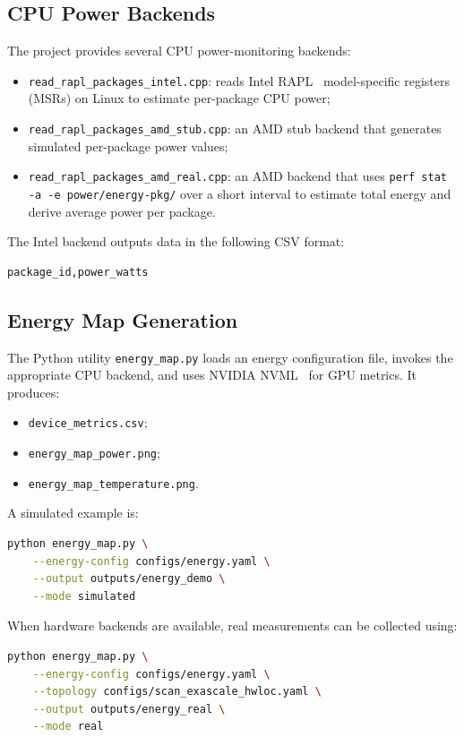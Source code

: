 \documentclass[conference]{IEEEtran}
\begin{document}
\subsection{CPU Power Backends}
The project provides several CPU power-monitoring backends:
\begin{itemize}
    \item \texttt{read\_rapl\_packages\_intel.cpp}: reads Intel
    RAPL~\cite{rapl} model-specific registers (MSRs) on Linux to estimate
    per-package CPU power;
    \item \texttt{read\_rapl\_packages\_amd\_stub.cpp}: an AMD stub backend that
    generates simulated per-package power values;
    \item \texttt{read\_rapl\_packages\_amd\_real.cpp}: an AMD backend that uses
    \texttt{perf stat -a -e power/energy-pkg/} over a short interval to
    estimate total energy and derive average power per package.
\end{itemize}

The Intel backend outputs data in the following CSV format:
\begin{lstlisting}[language=bash]
package_id,power_watts
\end{lstlisting}

\subsection{Energy Map Generation}
The Python utility \texttt{energy\_map.py} loads an energy configuration file,
invokes the appropriate CPU backend, and uses NVIDIA NVML~\cite{nvml} for GPU
metrics. It produces:
\begin{itemize}
    \item \texttt{device\_metrics.csv};
    \item \texttt{energy\_map\_power.png};
    \item \texttt{energy\_map\_temperature.png}.
\end{itemize}

A simulated example is:
\begin{lstlisting}[language=bash]
python energy_map.py \
    --energy-config configs/energy.yaml \
    --output outputs/energy_demo \
    --mode simulated
\end{lstlisting}

When hardware backends are available, real measurements can be collected using:
\begin{lstlisting}[language=bash]
python energy_map.py \
    --energy-config configs/energy.yaml \
    --topology configs/scan_exascale_hwloc.yaml \
    --output outputs/energy_real \
    --mode real
\end{lstlisting}
\end{document}
